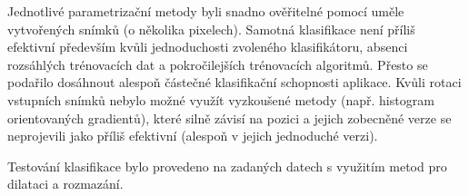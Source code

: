 \documentclass[12pt]{article}
\begin{document}
Jednotlivé parametrizační metody byli snadno ověřitelné pomocí uměle vytvořených snímků (o několika pixelech).
Samotná klasifikace není příliš efektivní především kvůli jednoduchosti zvoleného klasifikátoru, absenci rozsáhlých trénovacích dat a pokročilejších trénovacích algoritmů. Přesto se podařilo dosáhnout alespoň částečné klasifikační schopnosti aplikace. Kvůli rotaci vstupních snímků nebylo možné využít vyzkoušené metody (např. histogram orientovaných gradientů), které silně závisí na pozici a jejich zobecněné verze se neprojevili jako příliš efektivní (alespoň v jejich jednoduché verzi).

Testování klasifikace bylo provedeno na zadaných datech s využitím metod pro dilataci a rozmazání.
\end{document}
